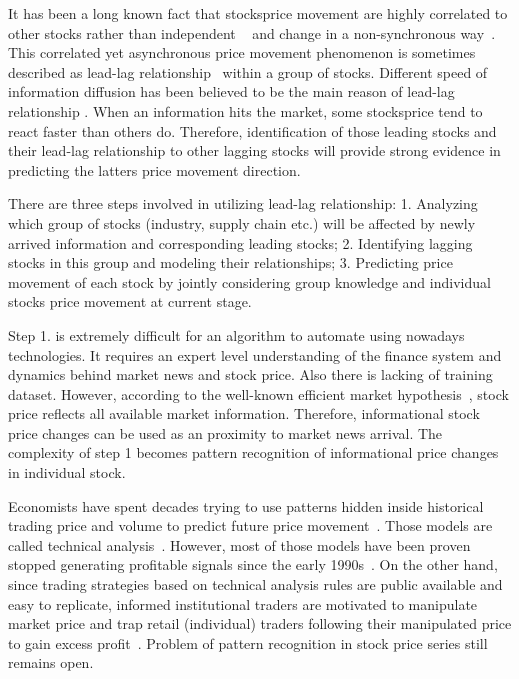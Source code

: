 \documentclass[sigconf, anonymous, review]{acmart}
\renewcommand{\cite}{\citep}
\begin{document}
It has been a long known fact that stocks\textquotesingle price movement are
highly correlated to other stocks rather than independent
~\cite{lo1990contrarian,mech1993portfolio} and change in a
non-synchronous
way~\cite{lo1990contrarian,brennan1993investment}. This
correlated yet asynchronous price movement phenomenon is
sometimes described as lead-lag
relationship~\cite{hou2007industry} within a group of stocks.
Different speed of information diffusion has been believed to be
the main reason of lead-lag relationship
\cite{lo1990contrarian,badrinath1995shepherds,mcqueen1996delayed}.
When an information hits the market, some stocks\textquotesingle price tend to
react faster than others do. Therefore, identification of those
leading stocks and their lead-lag relationship to other lagging
stocks will provide strong evidence in predicting the latter\textquotesingle s
price movement direction.

There are three steps involved in utilizing lead-lag
relationship: 1. Analyzing which group of stocks (industry,
supply chain etc.) will be affected by newly arrived information
and corresponding leading stocks; 2. Identifying lagging stocks
in this group and modeling their relationships; 3. Predicting
price movement of each stock by jointly considering group
knowledge and individual stock\textquotesingle s price movement at current stage.

Step 1. is extremely difficult for an algorithm to automate using
nowadays technologies. It requires an expert level understanding
of the finance system and dynamics behind market news and stock
price. Also there is lacking of training dataset. However,
according to the well-known efficient market
hypothesis~\cite{malkiel1970efficient}, stock price reflects all
available market information. Therefore, informational stock
price changes can be used as an proximity to market news arrival.
The complexity of step 1 becomes pattern recognition of
informational price changes in individual stock.

Economists have spent decades trying to use patterns hidden
inside historical trading price and volume to predict future
price movement~\cite{fama1966filter,jensen1967random}. Those
models are called technical
analysis~\cite{kirkpatrick2010technical}. However, most of those
models have been proven stopped generating profitable signals
since the early 1990s~\cite{park2007we}. On the other hand, since
trading strategies based on technical analysis rules are public
available and easy to replicate, informed institutional traders
are motivated to manipulate market price and trap retail
(individual) traders following their manipulated price to gain
excess profit~\cite{sun2016decision}. Problem of pattern
recognition in stock price series still remains open.
\end{document}
